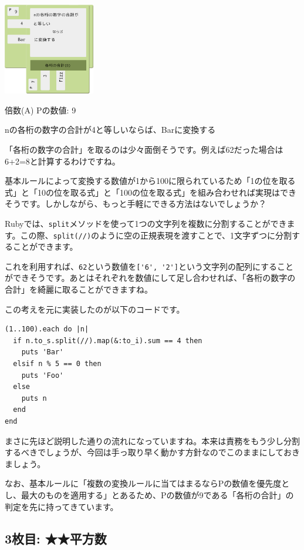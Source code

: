 \documentclass[index]{subfiles}
\begin{document}
\begin{center}
  \includegraphics[height=4cm]{image/202_replay_1_2.png}
\end{center}

\begin{itembox}[l]{倍数(A)}
Pの数値: 9

nの各桁の数字の合計が4と等しいならば、Barに変換する
\end{itembox}

「各桁の数字の合計」を取るのは少々面倒そうです。例えば62だった場合は6+2=8と計算するわけですね。

基本ルールによって変換する数値が1から100に限られているため「1の位を取る式」と「10の位を取る式」と「100の位を取る式」を組み合わせれば実現はできそうです。しかしながら、もっと手軽にできる方法はないでしょうか？

Rubyでは、\verb+split+メソッドを使って1つの文字列を複数に分割することができます。この際、\verb+split(//)+のように空の正規表現を渡すことで、1文字ずつに分割することができます。

これを利用すれば、\verb+62+という数値を\verb+['6', '2']+という文字列の配列にすることができそうです。あとはそれぞれを数値にして足し合わせれば、「各桁の数字の合計」を綺麗に取ることができますね。

この考えを元に実装したのが以下のコードです。

\begin{lstlisting}
(1..100).each do |n|
  if n.to_s.split(//).map(&:to_i).sum == 4 then
    puts 'Bar'
  elsif n % 5 == 0 then
    puts 'Foo'
  else
    puts n
  end
end
\end{lstlisting}

まさに先ほど説明した通りの流れになっていますね。本来は責務をもう少し分割するべきでしょうが、今回は手っ取り早く動かす方針なのでこのままにしておきましょう。

なお、基本ルールに「複数の変換ルールに当てはまるならPの数値を優先度とし、最大のものを適用する」とあるため、Pの数値が9である「各桁の合計」の判定を先に持ってきています。

  \subsection{3枚目: ★★平方数}
\end{document}
